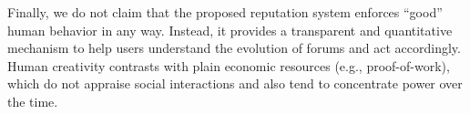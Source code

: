 \documentclass[12pt]{article}
\newcommand{\reps}     {\emph{reps}\xspace}
\begin{document}
Finally, we do not claim that the proposed reputation system enforces ``good''
human behavior in any way.
Instead, it provides a transparent and quantitative mechanism to help users
understand the evolution of forums and act accordingly.
Human creativity contrasts with plain economic resources (e.g.,
proof-of-work), which do not appraise social interactions and also tend
to concentrate power over the time.
%

\end{document}
